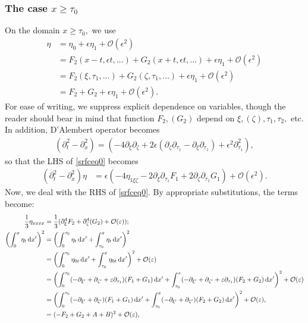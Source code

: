 \documentclass[10pt,reqno,oneside,a4paper, landscape]{article}
\begin{document}
\subsubsection{The case $x\geq \tau_0$}
On the domain $x\geq \tau_0,$ we use 
\begin{align*}
\eta &= \eta_0 + \epsilon \eta_1 + \mathcal{O}(\epsilon^2)  \\
&= F_2(x-t, \epsilon t, \ldots) + G_2(x+t, \epsilon t, \ldots) + \epsilon \eta_1 + \mathcal{O}(\epsilon^2) \\
&= F_2(\xi, \tau_1, \ldots) + G_2(\zeta, \tau_1, \ldots) + \epsilon \eta_1 + \mathcal{O}(\epsilon^2) \\
&= F_2+G_2 + \epsilon \eta_1 +  \mathcal{O}(\epsilon^2).
\end{align*}
For ease of writing, we suppress explicit dependence on variables, though the reader should bear in mind that function $F_2, (G_2)$ depend on $\xi, (\zeta), \tau_1, \tau_2,$ etc. In addition, D'Alembert operator becomes 
\begin{align*}
(\partial_t^2 - \partial_x^2) = \left( - 4\partial_\xi \partial_\zeta + 2\epsilon(\partial_\zeta \partial_{\tau_1} - \partial_\xi\partial_{\tau_1}) + \epsilon^2 \partial_{\tau_1}^2 \right),
\end{align*}
so that the LHS of \eqref{srfceq0} becomes
\begin{align}
(\partial_t^2 - \partial_x^2) \eta &= \epsilon \left(- 4\eta_{1\xi \zeta} - 2\partial_{\xi}\partial_{\tau_1} F_1 + 2\partial_{\zeta}\partial_{\tau_1}G_1\right) + \mathcal{O}(\epsilon^2). \label{LHS1-2}
\end{align}
Now, we deal with the RHS of \eqref{srfceq0}. By appropriate substitutions, the terms become:
\begin{align*}
\frac{1}{3}\eta_{xxxx} &= \frac{1}{3}(\partial_\xi^4 F_2 + \partial_\zeta^4(G_2)+ \mathcal{O}(\varepsilon)); \\
\left( \int^{x}_{0} \eta_t \,\mathrm{d} x' \right)^2 &= \left( \int^{\tau_0}_{0} \eta_t \,\mathrm{d} x' + \int_{\tau_0}^{x} \eta_t \,\mathrm{d} x' \right)^2 \\
&= \left( \int^{\tau_0}_{0} \eta_{0t} \,\mathrm{d} x' + \int_{\tau_0}^{x} \eta_{0t} \,\mathrm{d} x' \right)^2 + \mathcal{O}(\varepsilon) \\ 
&= \left( \int^{\tau_0}_{0} (-\partial_{\xi'} + \partial_{\zeta'} + \varepsilon \partial_{\tau_1}) (F_1+G_1) \,\mathrm{d} x' + \int_{\tau_0}^{x} (-\partial_{\xi'} + \partial_{\zeta'} + \varepsilon \partial_{\tau_1}) (F_2+G_2) \,\mathrm{d} x' \right)^2 + \mathcal{O}(\varepsilon) \\
&= \left( \int^{\tau_0}_{0} (-\partial_{\xi'} + \partial_{\zeta'}) (F_1+G_1) \,\mathrm{d} x' + \int_{\tau_0}^{x} (-\partial_{\xi'} + \partial_{\zeta'}) (F_2+G_2) \,\mathrm{d} x' \right)^2 + \mathcal{O}(\varepsilon), \\
&= (-F_2 + G_2 + A +B)^2+ \mathcal{O}(\varepsilon),
\end{align*}
\end{document}
